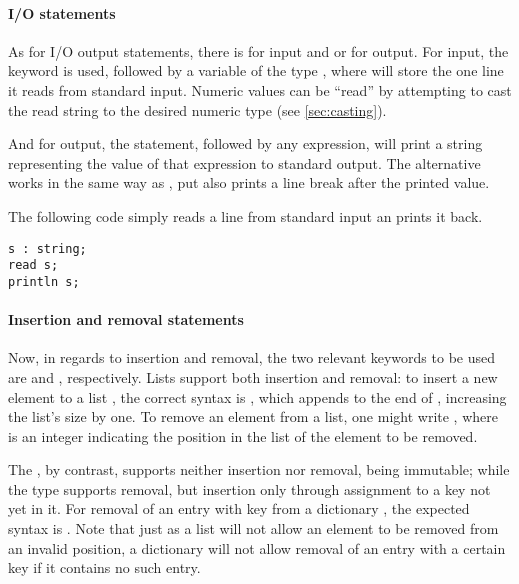 \paragraph{I/O statements}
\label{sec:io}

As for I/O output statements, there is  for input and  or  for output. For input, the  keyword is used, followed by a variable of the type , where  will store the one line it reads from standard input. Numeric values can be ``read'' by attempting to cast the read string to the desired numeric type (see \ref{sec:casting}).

And for output, the  statement, followed by any expression, will print a string representing the value of that expression to standard output. The  alternative works in the same way as , put also prints a line break after the printed value.

The following code simply reads a line from standard input an prints it back.
\begin{lstlisting}[language=Gryph]
s : string;
read s;
println s;
\end{lstlisting}

\paragraph{Insertion and removal statements}
\label{sec:add-del}
Now, in regards to insertion and removal, the two relevant keywords to be used are  and , respectively. Lists support both insertion and removal: to insert a new element  to a list , the correct syntax is    , which appends  to the end of , increasing the list's size by one. To remove an element from a list, one might write    , where  is an integer indicating the position in the list of the element to be removed.

The , by contrast, supports neither insertion nor removal, being immutable; while the  type supports removal, but insertion only through assignment to a key not yet in it. For removal of an entry with key  from a dictionary , the expected syntax is    . Note that just as a list will not allow an element to be removed from an invalid position, a dictionary will not allow removal of an entry with a certain key if it contains no such entry.

